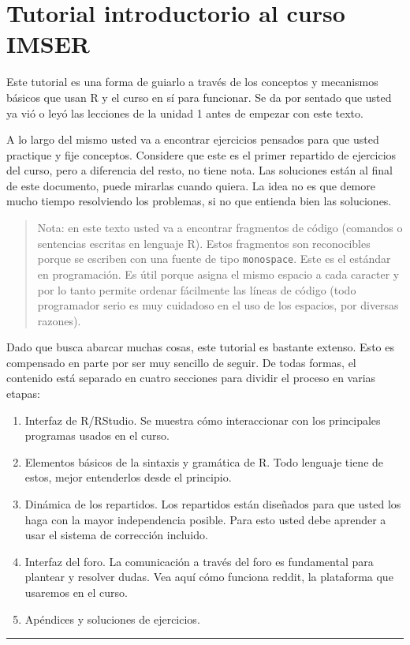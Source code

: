 \documentclass[]{article}
\begin{document}
\section{Tutorial introductorio al curso IMSER}

Este tutorial es una forma de guiarlo a través de los conceptos y
mecanismos básicos que usan R y el curso en sí para funcionar. Se da por
sentado que usted ya vió o leyó las lecciones de la unidad 1 antes de
empezar con este texto.

A lo largo del mismo usted va a encontrar ejercicios pensados para que
usted practique y fije conceptos. Considere que este es el primer
repartido de ejercicios del curso, pero a diferencia del resto, no tiene
nota. Las soluciones están al final de este documento, puede mirarlas
cuando quiera. La idea no es que demore mucho tiempo resolviendo los
problemas, si no que entienda bien las soluciones.

\begin{quote}
Nota: en este texto usted va a encontrar fragmentos de código (comandos
o sentencias escritas en lenguaje R). Estos fragmentos son reconocibles
porque se escriben con una fuente de tipo \texttt{monospace}. Este es el
estándar en programación. Es útil porque asigna el mismo espacio a cada
caracter y por lo tanto permite ordenar fácilmente las líneas de código
(todo programador serio es muy cuidadoso en el uso de los espacios, por
diversas razones).

\end{quote}
Dado que busca abarcar muchas cosas, este tutorial es bastante extenso.
Esto es compensado en parte por ser muy sencillo de seguir. De todas
formas, el contenido está separado en cuatro secciones para dividir el
proceso en varias etapas:

\begin{enumerate}[1.]
\item
  Interfaz de R/RStudio. Se muestra cómo interaccionar con los
  principales programas usados en el curso.
\item
  Elementos básicos de la sintaxis y gramática de R. Todo lenguaje tiene
  de estos, mejor entenderlos desde el principio.
\item
  Dinámica de los repartidos. Los repartidos están diseñados para que
  usted los haga con la mayor independencia posible. Para esto usted
  debe aprender a usar el sistema de corrección incluido.
\item
  Interfaz del foro. La comunicación a través del foro es fundamental
  para plantear y resolver dudas. Vea aquí cómo funciona reddit, la
  plataforma que usaremos en el curso.
\item
  Apéndices y soluciones de ejercicios.
\end{enumerate}
\begin{center}\rule{3in}{0.4pt}\end{center}
\end{document}
